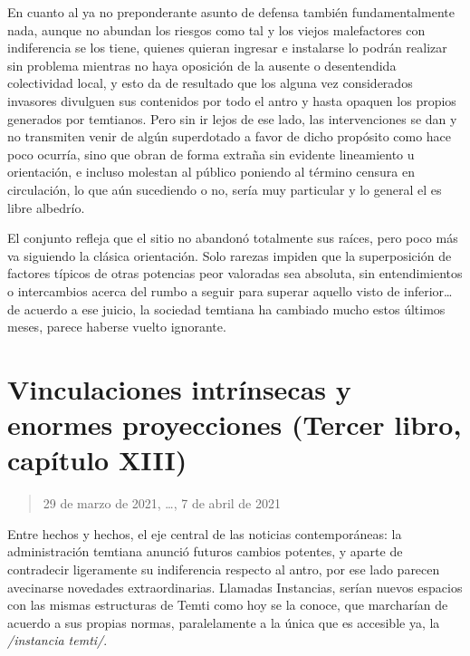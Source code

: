 \documentclass[
]{book}
\begin{document}
En cuanto al ya no preponderante asunto de defensa también fundamentalmente nada, aunque no abundan los riesgos como tal y los viejos malefactores con indiferencia se los tiene, quienes quieran ingresar e instalarse lo podrán realizar sin problema mientras no haya oposición de la ausente o desentendida colectividad local, y esto da de resultado que los alguna vez considerados invasores divulguen sus contenidos por todo el antro y hasta opaquen los propios generados por temtianos. Pero sin ir lejos de ese lado, las intervenciones se dan y no transmiten venir de algún superdotado a favor de dicho propósito como hace poco ocurría, sino que obran de forma extraña sin evidente lineamiento u orientación, e incluso molestan al público poniendo al término censura en circulación, lo que aún sucediendo o no, sería muy particular y lo general el es libre albedrío.

El conjunto refleja que el sitio no abandonó totalmente sus raíces, pero poco más va siguiendo la clásica orientación. Solo rarezas impiden que la superposición de factores típicos de otras potencias peor valoradas sea absoluta, sin entendimientos o intercambios acerca del rumbo a seguir para superar aquello visto de inferior\ldots{} de acuerdo a ese juicio, la sociedad temtiana ha cambiado mucho estos últimos meses, parece haberse vuelto ignorante.

\hypertarget{vinculaciones-intruxednsecas-y-enormes-proyecciones-tercer-libro-capuxedtulo-xiii}{%
\section{Vinculaciones intrínsecas y enormes proyecciones (Tercer libro, capítulo XIII)}\label{vinculaciones-intruxednsecas-y-enormes-proyecciones-tercer-libro-capuxedtulo-xiii}}

\begin{quote}
29 de marzo de 2021, \ldots, 7 de abril de 2021
\end{quote}

Entre hechos y hechos, el eje central de las noticias contemporáneas: la administración temtiana anunció futuros cambios potentes, y aparte de contradecir ligeramente su indiferencia respecto al antro, por ese lado parecen avecinarse novedades extraordinarias. Llamadas Instancias, serían nuevos espacios con las mismas estructuras de Temti como hoy se la conoce, que marcharían de acuerdo a sus propias normas, paralelamente a la única que es accesible ya, la \emph{/instancia temti/}.
\end{document}
